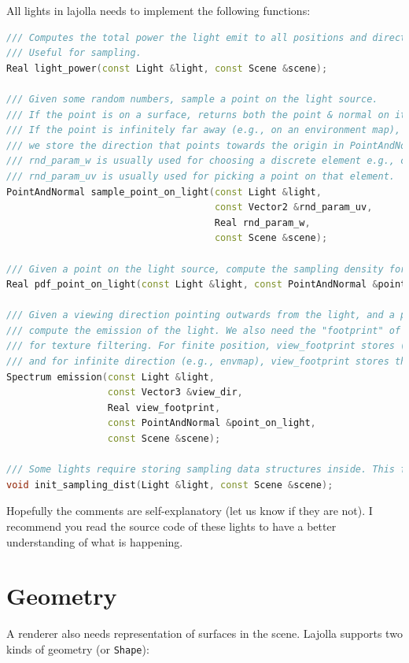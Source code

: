 \documentclass{article}
\begin{document}
All lights in lajolla needs to implement the following functions:
\begin{lstlisting}[language=c++]
/// Computes the total power the light emit to all positions and directions.
/// Useful for sampling.
Real light_power(const Light &light, const Scene &scene);

/// Given some random numbers, sample a point on the light source.
/// If the point is on a surface, returns both the point & normal on it.
/// If the point is infinitely far away (e.g., on an environment map),
/// we store the direction that points towards the origin in PointAndNormal.normal.
/// rnd_param_w is usually used for choosing a discrete element e.g., choosing a triangle in a mesh light.
/// rnd_param_uv is usually used for picking a point on that element.
PointAndNormal sample_point_on_light(const Light &light, 
                                     const Vector2 &rnd_param_uv,
                                     Real rnd_param_w,
                                     const Scene &scene);

/// Given a point on the light source, compute the sampling density for the function above.
Real pdf_point_on_light(const Light &light, const PointAndNormal &point_on_light, const Scene &scene);

/// Given a viewing direction pointing outwards from the light, and a point on the light,
/// compute the emission of the light. We also need the "footprint" of the ray
/// for texture filtering. For finite position, view_footprint stores (approximatedly) du/dx
/// and for infinite direction (e.g., envmap), view_footprint stores the approximated ddir/dx.
Spectrum emission(const Light &light,
                  const Vector3 &view_dir,
                  Real view_footprint,
                  const PointAndNormal &point_on_light,
                  const Scene &scene);

/// Some lights require storing sampling data structures inside. This function initialize them.
void init_sampling_dist(Light &light, const Scene &scene);
\end{lstlisting}

Hopefully the comments are self-explanatory (let us know if they are not). I recommend you read the source code of these lights to have a better understanding of what is happening.

\section{Geometry}
A renderer also needs representation of surfaces in the scene. Lajolla supports two kinds of geometry (or \lstinline{Shape}):
\end{document}
